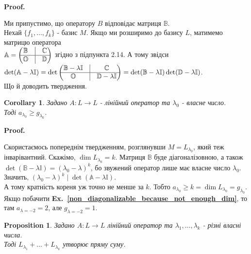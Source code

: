 \documentclass[a4paper, 10pt]{article}
\makeatletter
\theoremstyle{theoremdd}
\newtheorem{proposition}[theorem]{Proposition}
\newtheorem{corollary}[theorem]{Corollary}
\newcommand\exref[1]{\textbf{Ex.~\ref{#1}}}
\renewenvironment{proof}[1][Proof.\\]{\par
\pushQED{\hfill \qed}%
\normalfont \topsep6\p@\@plus6\p@\relax
\trivlist
\item\relax
{\bfseries
#1\@addpunct{.}}\hspace\labelsep\ignorespaces
}{%
\popQED\endtrivlist\@endpefalse
}
\makeatother
\begin{document}
\begin{proof}
Ми припустимо, що оператору $B$ відповідає матриця $\mathbb{B}$.\\
Нехай $\{f_1,\dots,f_k\}$ - базис $M$. Якщо ми розширимо до базису $L$, матимемо матрицю оператора\\
$\mathbb{A} = \begin{pmatrix}
\mathbb{B} & \vline & \mathbb{C} \\
\hline
\mathbb{O} & \vline & \mathbb{D}
\end{pmatrix}$ згідно з підпункта 2.14. А тому звідси\\
$\det (\mathbb{A} - \lambda \mathbb{I}) = \det \begin{pmatrix}
\mathbb{B}- \lambda \mathbb{I} & \vline & \mathbb{C} \\
\hline
\mathbb{O} & \vline & \mathbb{D}- \lambda \mathbb{I}
\end{pmatrix} = \det(\mathbb{B}-\lambda \mathbb{I}) \det (\mathbb{D} - \lambda \mathbb{I})$.\\
Що й доводить твердження.
\end{proof}

\begin{corollary}
Задано $A \colon L \to L$ - лінійний оператор та $\lambda_0$ - власне число.\\
Тоді $a_{\lambda_0} \geq g_{\lambda_0}$.
\end{corollary}

\begin{proof}
Скористаємось попереднім твердженням, розглянувши $M = L_{\lambda_0}$, який теж інварівантний. Скажімо, $\dim L_{\lambda_0} = k$. Матриця $\mathbb{B}$ буде діагоналізовною, а також $\det (\mathbb{B}-\lambda \mathbb{I}) = (\lambda_0-\lambda)^k$, бо звужений оператор лише має власне число $\lambda_0$.\\
Значить, $(\lambda_0-\lambda)^k \mid \det(\mathbb{A}-\lambda \mathbb{I})$.\\
А тому кратність кореня уж точно не менше за $k$. Тобто $a_{\lambda_0} \geq k = \dim L_{\lambda_0} = g_{\lambda_0}$.
\end{proof}
\noindent
Якщо побачити \exref{non_diagonalizable_because_not_enough_dim}, то там $a_{\lambda=-2} = 2$, але $g_{\lambda = -2} = 1$.

\begin{proposition}
Задано $A \colon L \to L$ лінійний оператор та $\lambda_1,\dots,\lambda_k$ - різні власні числа. \\
Тоді $L_{\lambda_1} + \dots + L_{\lambda_k}$ утворює пряму суму.
\end{proposition}
\end{document}
